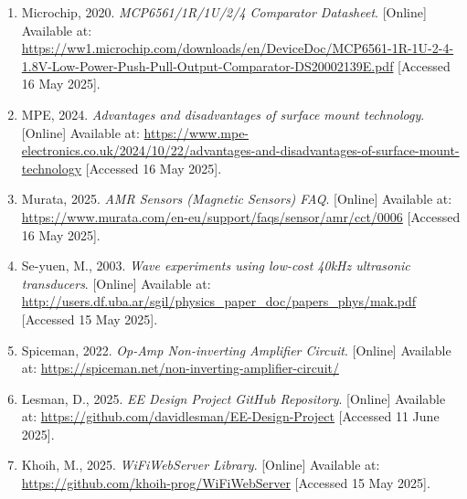 \documentclass[12pt,a4paper]{report}
\begin{document}
\begin{enumerate}
    \item Microchip, 2020. \textit{MCP6561/1R/1U/2/4 Comparator Datasheet}. [Online]
          Available at: \url{https://ww1.microchip.com/downloads/en/DeviceDoc/MCP6561-1R-1U-2-4-1.8V-Low-Power-Push-Pull-Output-Comparator-DS20002139E.pdf}
          [Accessed 16 May 2025].

    \item MPE, 2024. \textit{Advantages and disadvantages of surface mount technology}. [Online]
          Available at: \url{https://www.mpe-electronics.co.uk/2024/10/22/advantages-and-disadvantages-of-surface-mount-technology}
          [Accessed 16 May 2025].

    \item Murata, 2025. \textit{AMR Sensors (Magnetic Sensors) FAQ}. [Online]
          Available at: \url{https://www.murata.com/en-eu/support/faqs/sensor/amr/cct/0006}
          [Accessed 16 May 2025].

    \item Se-yuen, M., 2003. \textit{Wave experiments using low-cost 40kHz ultrasonic transducers}. [Online]
          Available at: \url{http://users.df.uba.ar/sgil/physics_paper_doc/papers_phys/mak.pdf}
          [Accessed 15 May 2025].

    \item Spiceman, 2022. \textit{Op-Amp Non-inverting Amplifier Circuit}. [Online]
          Available at: \url{https://spiceman.net/non-inverting-amplifier-circuit/}

    \item Lesman, D., 2025. \textit{EE Design Project GitHub Repository}. [Online]
          Available at: \url{https://github.com/davidlesman/EE-Design-Project}
          [Accessed 11 June 2025].

    \item Khoih, M., 2025. \textit{WiFiWebServer Library}. [Online]
          Available at: \url{https://github.com/khoih-prog/WiFiWebServer}
          [Accessed 15 May 2025].

\end{enumerate}
\end{document}
